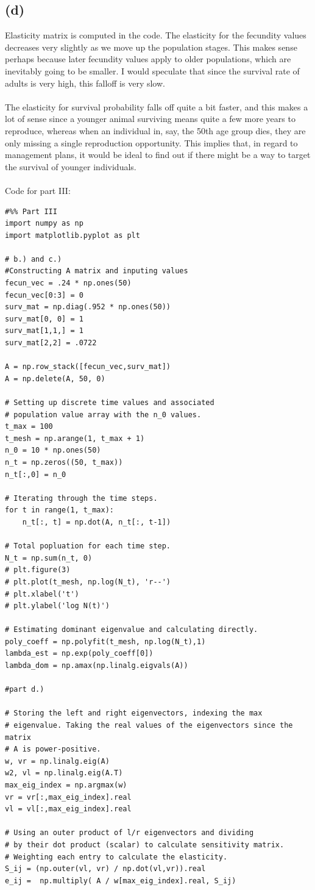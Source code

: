 \documentclass{article}
\begin{document}
\subsection*{\textbf{(d)}}
Elasticity matrix is computed in the code. The elasticity for the fecundity values decreases very slightly as we move up the population stages. This makes sense perhaps because later fecundity values apply to older populations, which are inevitably going to be smaller. I would speculate that since the survival rate of adults is very high, this falloff is very slow.\\
\\
The elasticity for survival probability falls off quite a bit faster, and this makes a lot of sense since a younger animal surviving means quite a few more years to reproduce, whereas when an individual in, say, the 50th age group dies, they are only missing a single reproduction opportunity. This implies that, in regard to management plans, it would be ideal to find out if there might be a way to target the survival of younger individuals.\\
\\
Code for part III:
\begin{lstlisting}
#%% Part III
import numpy as np
import matplotlib.pyplot as plt

# b.) and c.)
#Constructing A matrix and inputing values
fecun_vec = .24 * np.ones(50)
fecun_vec[0:3] = 0
surv_mat = np.diag(.952 * np.ones(50))
surv_mat[0, 0] = 1
surv_mat[1,1,] = 1
surv_mat[2,2] = .0722

A = np.row_stack([fecun_vec,surv_mat])
A = np.delete(A, 50, 0)

# Setting up discrete time values and associated
# population value array with the n_0 values.
t_max = 100
t_mesh = np.arange(1, t_max + 1)
n_0 = 10 * np.ones(50)
n_t = np.zeros((50, t_max))
n_t[:,0] = n_0

# Iterating through the time steps.
for t in range(1, t_max):
    n_t[:, t] = np.dot(A, n_t[:, t-1])

# Total popluation for each time step.
N_t = np.sum(n_t, 0)
# plt.figure(3)
# plt.plot(t_mesh, np.log(N_t), 'r--')
# plt.xlabel('t')
# plt.ylabel('log N(t)')

# Estimating dominant eigenvalue and calculating directly.
poly_coeff = np.polyfit(t_mesh, np.log(N_t),1)
lambda_est = np.exp(poly_coeff[0])
lambda_dom = np.amax(np.linalg.eigvals(A))

#part d.)

# Storing the left and right eigenvectors, indexing the max
# eigenvalue. Taking the real values of the eigenvectors since the matrix
# A is power-positive.
w, vr = np.linalg.eig(A)
w2, vl = np.linalg.eig(A.T)
max_eig_index = np.argmax(w)
vr = vr[:,max_eig_index].real
vl = vl[:,max_eig_index].real

# Using an outer product of l/r eigenvectors and dividing
# by their dot product (scalar) to calculate sensitivity matrix.
# Weighting each entry to calculate the elasticity.
S_ij = (np.outer(vl, vr) / np.dot(vl,vr)).real
e_ij =  np.multiply( A / w[max_eig_index].real, S_ij)
\end{lstlisting}
\end{document}

